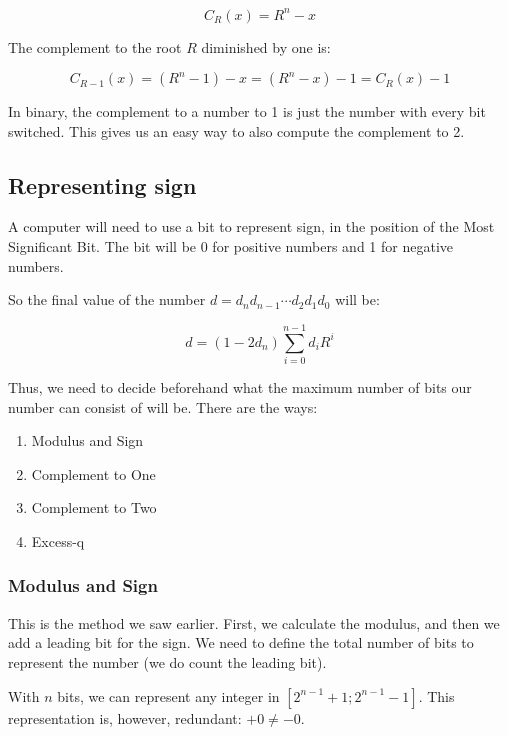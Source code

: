 \documentclass[12pt,a4paper]{report}
\numberwithin{equation}{section}
\theoremstyle{definition}
\theoremstyle{remark}
\begin{document}
\begin{equation}
C_R (x)  = R^n -x
\end{equation}

The complement to the root $R$ diminished by one is:

\begin{equation}
C_{R-1} (x) = (R^n -1 ) -x = (R^n - x)-1 = C_R (x) -1
\end{equation}

In binary, the complement to a number to 1 is just the number with every bit switched. This gives us an easy way to also compute the complement to 2.

\subsection{Representing sign}

A computer will need to use a bit to represent sign, in the position of the Most Significant Bit. The bit will be 0 for positive numbers and 1 for negative numbers.

So the final value of the number $d = d_n d_{n-1} \cdots d_2 d_1 d_0$ will be:

\begin{equation}
d= (1-2d_n)\sum_{i=0}^{n-1} d_i R^i
\end{equation}

Thus, we need to decide beforehand what the maximum number of bits our number can consist of will be.
There are the ways:

\begin{enumerate}
\item Modulus and Sign
\item Complement to One
\item Complement to Two
\item Excess-q
\end{enumerate}

\subsubsection{Modulus and Sign}

This is the method we saw earlier. First, we calculate the modulus, and then we add a leading bit for the sign. We need to define the total number of bits to represent the number (we do count the leading bit).

With $n$ bits, we can represent any integer in $[2^{n-1}+1; 2^{n-1}-1]$. This representation is, however, redundant: $+0 \neq -0$.
\end{document}
